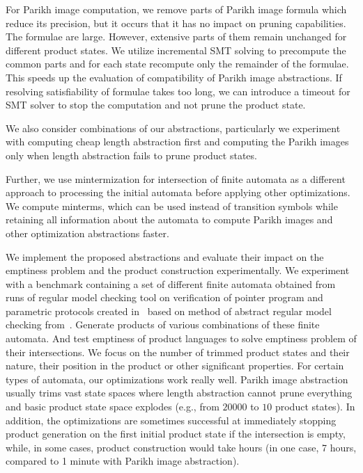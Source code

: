 For Parikh image computation, we remove parts of Parikh image formula which reduce its precision, but it occurs that it has no impact on pruning capabilities. The formulae are large. However, extensive parts of them remain unchanged for different product states. We utilize incremental SMT solving to precompute the common parts and for each state recompute only the remainder of the formulae. This speeds up the evaluation of compatibility of Parikh image abstractions. If resolving satisfiability of formulae takes too long, we can introduce a timeout for SMT solver to stop the computation and not prune the product state.

We also consider combinations of our abstractions, particularly we experiment with computing cheap length abstraction first and computing the Parikh images only when length abstraction fails to prune product states.


Further, we use mintermization for intersection of finite automata as a different approach to processing the initial automata before applying other optimizations. We compute minterms, which can be used instead of transition symbols while retaining all information about the automata to compute Parikh images and other optimization abstractions faster.


We implement the proposed abstractions and evaluate their impact on the emptiness problem and the product construction experimentally. We experiment with a benchmark containing a set of different finite automata obtained from runs of regular model checking tool on verification of pointer program and parametric protocols created in~\cite{model_checking_tool_10.1007/978-3-540-70844-5_7} based on method of abstract regular model checking from~\cite{method_model_checking_tool}. Generate products of various combinations of these finite automata. And test emptiness of product languages to solve emptiness problem of their intersections. We focus on the number of trimmed product states and their nature, their position in the product or other significant properties. For certain types of automata, our optimizations work really well. Parikh image abstraction usually trims vast state spaces where length abstraction cannot prune everything and basic product state space explodes (e.g., from $20000$ to $10$ product states). In addition, the optimizations are sometimes successful at immediately stopping product generation on the first initial product state if the intersection is empty, while, in some cases, product construction would take hours (in one case, 7 hours, compared to 1 minute with Parikh image abstraction).

